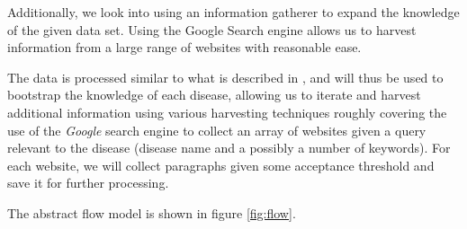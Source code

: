 \documentclass[10pt,letterpaper,final]{article}
\begin{document}
Additionally, we look into using an information gatherer to expand the
knowledge of the given data set. Using the Google Search engine allows
us to harvest information from a large range of websites with reasonable
ease.




The data is processed similar to what is described in
\cite{jensenandersen}, and will thus be used to bootstrap the knowledge
of each disease, allowing us to iterate and harvest additional
information using various harvesting techniques roughly covering the use
of the \textit{Google} search engine to collect an array of websites
given a query relevant to the disease (disease name and a possibly a
number of keywords). For each website, we will collect paragraphs given some acceptance threshold and
save it for further processing.


The abstract flow model is shown in figure \ref{fig:flow}.
\end{document}
